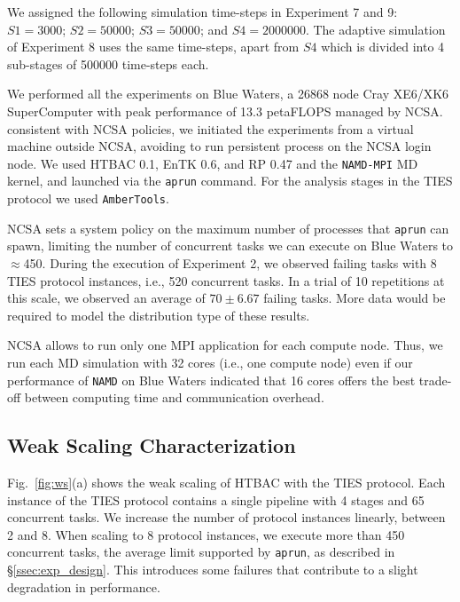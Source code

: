 We assigned the following simulation time-steps in Experiment 7 and 9:
$S1=3000$; $S2=50000$; $S3=50000$; and $S4=2000000$. The adaptive simulation
of Experiment 8 uses the same time-steps, apart from $S4$ which is divided
into 4 sub-stages of 500000 time-steps each.

We performed all the experiments on Blue Waters, a 26868 node Cray XE6/XK6
SuperComputer with peak performance of 13.3 petaFLOPS managed by NCSA.
consistent with NCSA policies, we initiated the experiments from a virtual
machine outside NCSA, avoiding to run persistent process on the NCSA login
node. We used HTBAC 0.1, EnTK 0.6, and RP 0.47 and the \texttt{NAMD-MPI} MD
kernel, and launched via the \texttt{aprun} command. For the analysis stages
in the TIES protocol we used \texttt{AmberTools}.

NCSA sets a system policy on the maximum number of processes that
\texttt{aprun} can spawn, limiting the number of concurrent tasks we can
execute on Blue Waters to $\approx$450. During the execution of Experiment 2,
we observed failing tasks with 8 TIES protocol instances, i.e., 520
concurrent tasks. In a trial of 10 repetitions at this scale, we observed an
average of $70\pm6.67$ failing tasks. More data would be required to model
the distribution type of these results.

NCSA allows to run only one MPI application for each compute node. Thus, we
run each MD simulation with 32 cores (i.e., one compute node) even if our
performance of \texttt{NAMD} on Blue Waters indicated that 16 cores offers
the best trade-off between computing time and communication overhead.

\subsection{Weak Scaling Characterization}

Fig.~\ref{fig:ws}(a) shows the weak scaling of HTBAC with the TIES protocol.
Each instance of the TIES protocol contains a single pipeline with 4 stages
and 65 concurrent tasks. We increase the number of protocol instances
linearly, between 2 and 8. When scaling to 8 protocol instances, we execute
more than 450 concurrent tasks, the average limit supported by
\texttt{aprun}, as described in \S\ref{ssec:exp_design}. This introduces some
failures that contribute to a slight degradation in performance.


